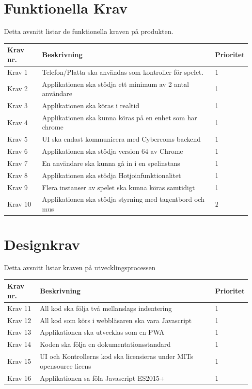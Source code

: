 \documentclass[10pt]{article}
\begin{document}
\pagebreak
\section{Funktionella Krav}
	Detta avsnitt listar de funktionella kraven på produkten.	
	
	\begin{tabular}{| p{2cm} | p{8cm} | p{2cm}|}
		\hline
		
		\textbf{Krav nr.} & \textbf{Beskrivning} &\textbf{Prioritet} \\ \hline
		Krav 1 & Telefon/Platta ska användas som kontroller för spelet. & 1 \\ \hline
		Krav 2 & Applikationen ska stödja ett minimum av 2 antal användare & 1 \\ \hline
		Krav 3 & Applikationen ska köras i realtid & 1 \\ \hline
		Krav 4 & Applikationen ska kunna köras på en enhet som har chrome & 1 \\ \hline
		Krav 5 & UI ska endast kommunicera med Cybercoms backend & 1 \\ \hline
		Krav 6 & Applikationen ska stödja version 64 av Chrome & 1 \\ \hline
		Krav 7 & En användare ska kunna gå in i en spelinstans & 1 \\ \hline
		Krav 8 & Applikationen ska stödja Hotjoinfunktionalitet & 1 \\ \hline
		Krav 9 & Flera instanser av spelet ska kunna köras samtidigt & 1 \\ \hline
		Krav 10 & Applikationen ska stödja styrning med tagentbord och mus & 2 \\ \hline
		
		
	\end{tabular}
	
\section{Designkrav}
	Detta avsnitt listar kraven på utvecklingsprocessen
	
	\begin{tabular}{| p{2cm} | p{8cm} | p{2cm}|}
		\hline
		\textbf{Krav nr.} & \textbf{Beskrivning} & \textbf{Prioritet} \\ \hline
		Krav 11 & All kod ska följa två mellanslags indentering & 1\\ \hline
		Krav 12 & All kod som körs i webbläsaren ska vara Javascript & 1 \\ \hline
		Krav 13 & Applikationen ska utvecklas som en PWA & 1 \\ \hline
		Krav 14 & Koden ska följa en dokumentationsstandard & 1 \\ \hline
		Krav 15 & UI och Kontrollerns kod ska licensieras under MITs opensource licens & 1 \\ \hline
		Krav 16 & Applikationen sa föla Javascript ES2015+ & 1 \\ \hline
	\end{tabular}
\end{document}
